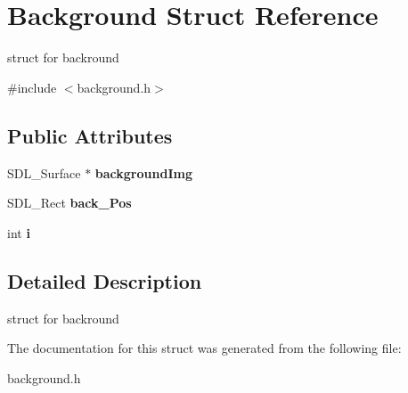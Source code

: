 \hypertarget{structBackground}{}\section{Background Struct Reference}
\label{structBackground}


struct for backround  




{\ttfamily \#include $<$background.\+h$>$}

\subsection*{Public Attributes}
\begin{DoxyCompactItemize}
\item 
\mbox{\label{structBackground_ade7f4649cb1e02ab75167ce898db884c}} 
S\+D\+L\+\_\+\+Surface $\ast$ {\bfseries background\+Img}
\item 
\mbox{\label{structBackground_a4921effe7d9612c8a1870bee947e4441}} 
S\+D\+L\+\_\+\+Rect {\bfseries back\+\_\+\+Pos}
\item 
\mbox{\label{structBackground_a7202c50e46b3883f61025d04c6e6629e}} 
int {\bfseries i}
\end{DoxyCompactItemize}


\subsection{Detailed Description}
struct for backround 

The documentation for this struct was generated from the following file\+:\begin{DoxyCompactItemize}
\item 
background.\+h\end{DoxyCompactItemize}
